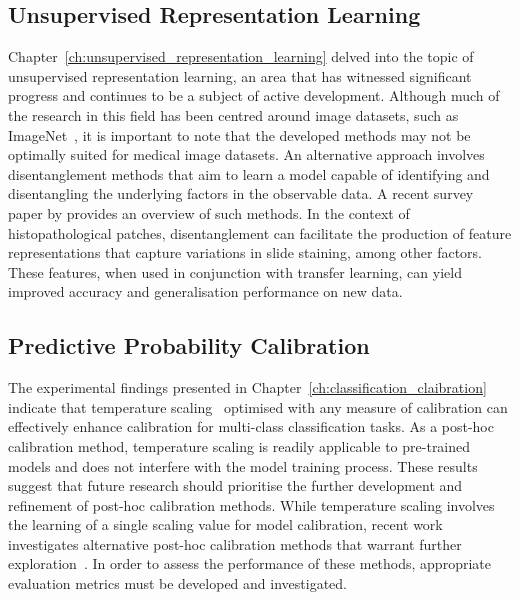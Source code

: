 \subsection{Unsupervised Representation Learning}
Chapter~\ref{ch:unsupervised_representation_learning} delved into the topic of unsupervised representation learning, an area that has witnessed significant progress and continues to be a subject of active development. Although much of the research in this field has been centred around image datasets, such as ImageNet~\citep{deng2009imagenet}, it is important to note that the developed methods may not be optimally suited for medical image datasets. An alternative approach involves disentanglement methods that aim to learn a model capable of identifying and disentangling the underlying factors in the observable data. A recent survey paper by \cite{liu2022learning} provides an overview of such methods. In the context of histopathological patches, disentanglement can facilitate the production of feature representations that capture variations in slide staining, among other factors. These features, when used in conjunction with transfer learning, can yield improved accuracy and generalisation performance on new data.

\subsection{Predictive Probability Calibration}
The experimental findings presented in Chapter~\ref{ch:classification_claibration} indicate that temperature scaling~\citep{guo2017calibration} optimised with any measure of calibration can effectively enhance calibration for multi-class classification tasks. As a post-hoc calibration method, temperature scaling is readily applicable to pre-trained models and does not interfere with the model training process. These results suggest that future research should prioritise the further development and refinement of post-hoc calibration methods. While temperature scaling involves the learning of a single scaling value for model calibration, recent work investigates alternative post-hoc calibration methods that warrant further exploration~\citep{song2021classifier}. In order to assess the performance of these methods, appropriate evaluation metrics must be developed and investigated.

